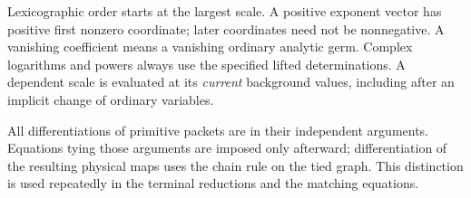 Lexicographic order starts at the largest scale. A positive exponent
vector has positive first nonzero coordinate; later coordinates need
not be nonnegative. A vanishing coefficient means a vanishing
ordinary analytic germ. Complex logarithms and powers always use the
specified lifted determinations. A dependent scale is evaluated at
its \emph{current} background values, including after an implicit
change of ordinary variables.

All differentiations of primitive packets are in their independent
arguments. Equations tying those arguments are imposed only
afterward; differentiation of the resulting physical maps uses the
chain rule on the tied graph. This distinction is used repeatedly in
the terminal reductions and the matching equations.
